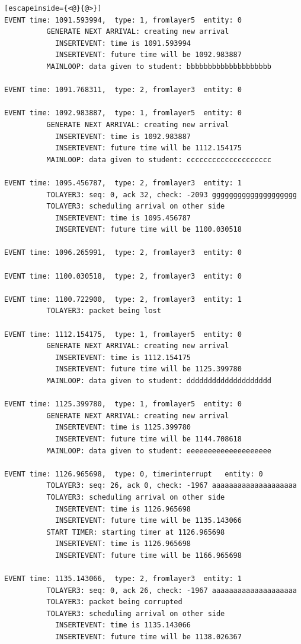\documentclass[paper=a4, fontsize=11pt]{scrartcl}
\numberwithin{equation}{section}		%
\numberwithin{figure}{section}			%
\numberwithin{table}{section}				%
\begin{document}
\begin{lstlisting}[escapeinside={<@}{@>}]
EVENT time: 1091.593994,  type: 1, fromlayer5  entity: 0
          GENERATE NEXT ARRIVAL: creating new arrival
            INSERTEVENT: time is 1091.593994
            INSERTEVENT: future time will be 1092.983887
          MAINLOOP: data given to student: bbbbbbbbbbbbbbbbbbbb

EVENT time: 1091.768311,  type: 2, fromlayer3  entity: 0

EVENT time: 1092.983887,  type: 1, fromlayer5  entity: 0
          GENERATE NEXT ARRIVAL: creating new arrival
            INSERTEVENT: time is 1092.983887
            INSERTEVENT: future time will be 1112.154175
          MAINLOOP: data given to student: cccccccccccccccccccc

EVENT time: 1095.456787,  type: 2, fromlayer3  entity: 1
          TOLAYER3: seq: 0, ack 32, check: -2093 gggggggggggggggggggg
          TOLAYER3: scheduling arrival on other side
            INSERTEVENT: time is 1095.456787
            INSERTEVENT: future time will be 1100.030518

EVENT time: 1096.265991,  type: 2, fromlayer3  entity: 0

EVENT time: 1100.030518,  type: 2, fromlayer3  entity: 0

EVENT time: 1100.722900,  type: 2, fromlayer3  entity: 1
          TOLAYER3: packet being lost

EVENT time: 1112.154175,  type: 1, fromlayer5  entity: 0
          GENERATE NEXT ARRIVAL: creating new arrival
            INSERTEVENT: time is 1112.154175
            INSERTEVENT: future time will be 1125.399780
          MAINLOOP: data given to student: dddddddddddddddddddd

EVENT time: 1125.399780,  type: 1, fromlayer5  entity: 0
          GENERATE NEXT ARRIVAL: creating new arrival
            INSERTEVENT: time is 1125.399780
            INSERTEVENT: future time will be 1144.708618
          MAINLOOP: data given to student: eeeeeeeeeeeeeeeeeeee

EVENT time: 1126.965698,  type: 0, timerinterrupt   entity: 0
          TOLAYER3: seq: 26, ack 0, check: -1967 aaaaaaaaaaaaaaaaaaaa
          TOLAYER3: scheduling arrival on other side
            INSERTEVENT: time is 1126.965698
            INSERTEVENT: future time will be 1135.143066
          START TIMER: starting timer at 1126.965698
            INSERTEVENT: time is 1126.965698
            INSERTEVENT: future time will be 1166.965698

EVENT time: 1135.143066,  type: 2, fromlayer3  entity: 1
          TOLAYER3: seq: 0, ack 26, check: -1967 aaaaaaaaaaaaaaaaaaaa
          TOLAYER3: packet being corrupted
          TOLAYER3: scheduling arrival on other side
            INSERTEVENT: time is 1135.143066
            INSERTEVENT: future time will be 1138.026367


\end{lstlisting}
\end{document}

